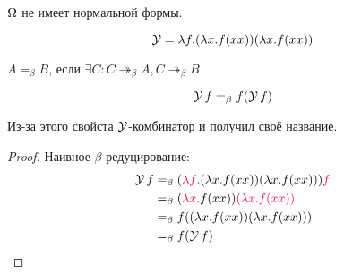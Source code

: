 $\operatorname{\Omega}$ не имеет нормальной формы.

\begin{definition}
    \[
        \operatorname{\mathcal{Y}} = \lambda f . (\lambda x . f (x x)) (\lambda x . f (x x))
    \]
\end{definition}

\begin{definition}
    $A=_{\beta}B$, если $\exists C : C \twoheadrightarrow_{\beta} A, C \twoheadrightarrow_{\beta}B$
\end{definition}

\begin{statement}
    \[
        \operatorname{\mathcal{Y}}f =_{\beta} f(\operatorname{\mathcal{Y}}f)
    \]
\end{statement}

Из-за этого свойста $\operatorname{\mathcal{Y}}$-комбинатор и получил своё название.

\begin{proof} Наивное $\beta$-редуцирование:
    \begin{align*}
        \comb Yf &=_{\beta} (\reduction{\lambda f} . (\lambda x . f (x x)) (\lambda x . f (x x))) \reduction f \\
                 &=_{\beta} (\reduction{\lambda x} . f (x x)) \reduction{(\lambda x . f (x x))} \\
                 &=_{\beta} f ((\lambda x . f (x x)) (\lambda x . f (x x))) \\
                 &=_{\beta} f (\comb Y f)
    \qedhere
    \end{align*}
\end{proof}

